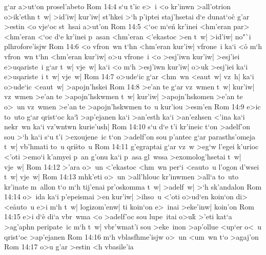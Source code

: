 g`ar
a>ut`on
prosel'abeto\bibvsend
\vs Rom 14:4
s`u
t'ic
e>~i
<o
kr'inwn
>all'otrion
o>ik'ethn
t~w|
>id'iw|
kur'iw|
st'hkei
>`h
p'iptei
staj'hsetai
d`e
dunat`oc\r{}
g'ar
>estin
<o
vje`oc
st~hsai
a>ut'on\bibvsend
\vs Rom 14:5
<`oc
m`e\r{n}
kr'inei
<hm'eran
par>
<hm'eran
<`oc
d`e
kr'inei
p~asan
<hm'eran
<'ekastoc
>en
t~w|
>id'iw|
no"`i
plhrofore'isjw\bibvsend
\vs Rom 14:6
<o
vfron~wn
t`hn
<hm'eran
kur'iw|
vfrone~i
ka`i
<o\r{}
m`h
vfron~wn
t`hn
<hm'eran
kur'iw|
o>u
vfrone~i
<o
>esj'iwn
kur'iw|
>esj'iei
e>uqariste~i
g`ar
t~w|
vje~w|
ka`i
<o
m`h
>esj'iwn
kur'iw|
o>uk
>esj'iei
ka`i
e>uqariste~i
t~w|
vje~w|\bibvsend
\vs Rom 14:7
o>ude`ic
g`ar
<hm~wn
<eaut~w|
vz~h|
ka`i
o>ude`ic
<eaut~w|
>apojn'hskei\bibvsend
\vs Rom 14:8
>e'an
te
g`ar
vz~wmen
t~w|
kur'iw|
vz~wmen
>e'an
te
>apojn'hskwmen
t~w|
kur'iw|
>apojn'hskomen
>e'an
te
o>~un
vz~wmen
>e'an
te
>apojn'hskwmen
to~u
kur'iou
>esm'en\bibvsend
\vs Rom 14:9
e>ic
to~uto
g`ar
qrist`oc
ka`i\r{}
>ap'ejanen
ka`i
>an'esth
ka`i
>an'ezhsen
<'ina
ka`i
nekr~wn
ka`i
vz'wntwn
kurie'ush|\bibvsend
\vs Rom 14:10
s`u
d`e
t'i
kr'ineic
t`on
>adelf'on
sou
>`h
ka`i
s`u
t'i
>exoujene~ic
t`on
>adelf'on
sou
p'antec
g`ar
parasths'omeja
t~w|
vb'hmati
to~u
qri\r{s}to~u\bibvsend
{}
\vs Rom 14:11
g'egraptai
g`ar
vz~w
>eg`w
l'egei
k'urioc
<'oti
>emo`i
k'amyei
p~an
g'onu
ka`i
p~asa
gl~wssa
>exomolog'hsetai
t~w|
vje~w|\bibvsend
\vs Rom 14:12
>'ara
o>~un
<'ekastoc
<hm~wn
per`i
<eauto~u
l'ogon
d'wsei
t~w|
vje~w|\bibvsend
\vs Rom 14:13
mhk'eti
o>~un
>all'hlouc
kr'inwmen
>all`a
to~uto
kr'inate
m~allon
t`o
m`h
tij'enai
pr'oskomma
t~w|
>adelf~w|
>`h
sk'andalon\bibvsend
\vs Rom 14:14
o>~ida
ka`i
p'epeismai
>en
kur'iw|
>ihso~u
<'oti
o>ud`en
koin`on
di>
<e\r{a}uto~u
e>i
m`h
t~w|
logizom'enw|
ti
koin`on
e>~inai
>eke'inw|
koin'on\bibvsend
\vs Rom 14:15
e>i
d`e\r{}
di`a
vbr~wma
<o
>adelf'oc
sou
lupe~itai
o>uk\r{}
>'eti
kat`a
>ag'aphn
peripate~ic
m`h
t~w|
vbr'wmat'i
sou
>eke~inon
>ap'ollue
<up`er
o<~u
qrist`oc
>ap'ejanen\bibvsend
\vs Rom 14:16
m`h
vblasfhme'isjw
o>~un
<um~wn
t`o
>agaj'on\bibvsend
\vs Rom 14:17
o>u
g'ar
>estin
<h
vbasile'ia
